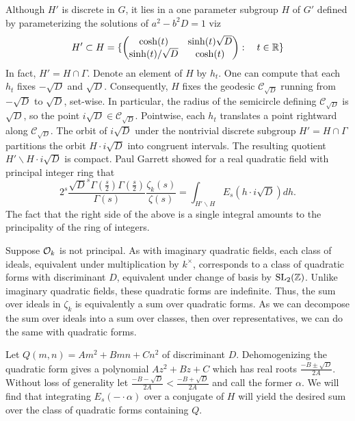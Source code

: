 \documentclass[11pt]{amsart}
\begin{document}
Although $H'$ is discrete in $G$, it lies in a one parameter subgroup $H$ of $G'$ defined by parameterizing the solutions of $a^2-b^2 D=1$ viz
\begin{equation*}
H'\subset H=\{ \begin{pmatrix}
    \cosh(t) & \sinh(t)\sqrt{D} \\ 
    \sinh(t)/\sqrt{D} & \cosh(t)     \end{pmatrix} : \hspace{10pt} t\in \mathbb{R} \}
\end{equation*}
In fact, $H'=H\cap \Gamma$. Denote an element of $H$ by $h_t$. One can compute that each $h_t$ fixes $-\sqrt{D}$ and $\sqrt{D}$. Consequently, $H$ fixes the geodesic $\mathcal{C}_{\sqrt{D}}$ running from $-\sqrt{D}$ to $\sqrt{D}$, set-wise. In particular, the radius of the semicircle defining $\mathcal{C}_{\sqrt{D}}$ is $\sqrt{D}$, so the point $i\sqrt{D}\in\mathcal{C}_{\sqrt{D}}$.  Pointwise, each $h_t$ translates a point rightward along $\mathcal{C}_{\sqrt{D}}$. The orbit of $i \sqrt{D}$ under the nontrivial discrete subgroup $H'=H\cap \Gamma$ partitions the orbit $H \cdot i\sqrt{D}$ into congruent intervals. The resulting quotient $H'\backslash H \cdot i\sqrt{D}$ is compact. Paul Garrett showed for a real quadratic field with principal integer ring that 
\begin{equation*}
2^s \frac{\sqrt{D}^s\Gamma(\frac{s}{2})\Gamma(\frac{s}{2})}{\Gamma(s)} \frac{\zeta_k(s)}{\zeta(s)}=\int_{H'\backslash H}E_s(h\cdot i \sqrt{D}) dh.
\end{equation*}
The fact that the right side of the above is a single integral amounts to the principality of the ring of integers.

Suppose $\mathcal{O}_k$ is not principal. As with imaginary quadratic fields,  each class of ideals, equivalent under multiplication by $k^\times$, corresponds to a class of quadratic forms with discriminant $D$, equivalent under change of basis by $\operatorname{SL}_2(\mathbb{Z})$. Unlike imaginary quadratic fields, these quadratic forms are indefinite. Thus, the sum over ideals in $\zeta_k$ is equivalently a sum over quadratic forms. As we can decompose the sum over ideals into a sum over classes, then over representatives, we can do the same with quadratic forms. 

Let $Q(m,n)=A m^2 +B mn+C n^2$ of discriminant $D$. Dehomogenizing the quadratic form gives a polynomial $Az^2+Bz+C$ which has real roots $\frac{-B \pm \sqrt{D}}{2A}$. Without loss of generality let $\frac{-B - \sqrt{D}}{2A}<\frac{-B + \sqrt{D}}{2A}$ and call the former $\alpha$. We will find that integrating $E_s(-\cdot \alpha)$ over a conjugate of $H$ will yield the desired sum over the class of quadratic forms containing $Q$. 
\end{document}
